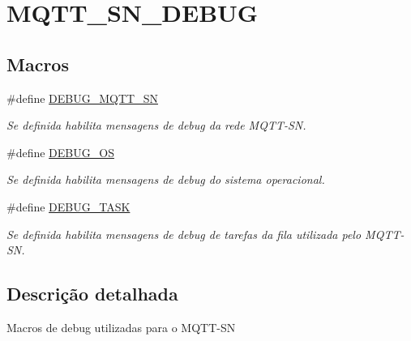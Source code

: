 \hypertarget{group__MQTT__SN__DEBUG}{\section{M\+Q\+T\+T\+\_\+\+S\+N\+\_\+\+D\+E\+B\+U\+G}
\label{group__MQTT__SN__DEBUG}
}
\subsection*{Macros}
\begin{DoxyCompactItemize}
\item 
\hypertarget{group__MQTT__SN__DEBUG_ga2949e816367fa801d4015f596cf2925a}{\#define \hyperlink{group__MQTT__SN__DEBUG_ga2949e816367fa801d4015f596cf2925a}{D\+E\+B\+U\+G\+\_\+\+M\+Q\+T\+T\+\_\+\+S\+N}}\label{group__MQTT__SN__DEBUG_ga2949e816367fa801d4015f596cf2925a}

\begin{DoxyCompactList}\small\item\em Se definida habilita mensagens de debug da rede M\+Q\+T\+T-\/\+S\+N. \end{DoxyCompactList}\item 
\hypertarget{group__MQTT__SN__DEBUG_ga7871b41b94f3b5aac9e79ad353903ae7}{\#define \hyperlink{group__MQTT__SN__DEBUG_ga7871b41b94f3b5aac9e79ad353903ae7}{D\+E\+B\+U\+G\+\_\+\+O\+S}}\label{group__MQTT__SN__DEBUG_ga7871b41b94f3b5aac9e79ad353903ae7}

\begin{DoxyCompactList}\small\item\em Se definida habilita mensagens de debug do sistema operacional. \end{DoxyCompactList}\item 
\hypertarget{group__MQTT__SN__DEBUG_gac3a54f3a6ca71cb643dc99df536f503c}{\#define \hyperlink{group__MQTT__SN__DEBUG_gac3a54f3a6ca71cb643dc99df536f503c}{D\+E\+B\+U\+G\+\_\+\+T\+A\+S\+K}}\label{group__MQTT__SN__DEBUG_gac3a54f3a6ca71cb643dc99df536f503c}

\begin{DoxyCompactList}\small\item\em Se definida habilita mensagens de debug de tarefas da fila utilizada pelo M\+Q\+T\+T-\/\+S\+N. \end{DoxyCompactList}\end{DoxyCompactItemize}


\subsection{Descrição detalhada}
Macros de debug utilizadas para o M\+Q\+T\+T-\/\+S\+N 
